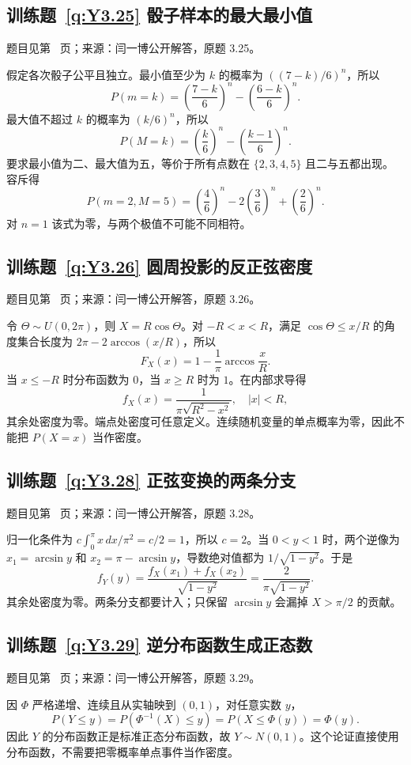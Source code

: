 \subsection*{训练题~\ref{q:Y3.25} 骰子样本的最大最小值}\label{a:Y3.25}{\small 题目见第~\pageref{q:Y3.25} 页；来源：闫一博公开解答，原题 3.25。}
\begin{solve}假定各次骰子公平且独立。最小值至少为 $k$ 的概率为 $((7-k)/6)^n$，所以\[P(m=k)=\left(\frac{7-k}{6}\right)^n-\left(\frac{6-k}{6}\right)^n.\]最大值不超过 $k$ 的概率为 $(k/6)^n$，所以\[P(M=k)=\left(\frac{k}{6}\right)^n-\left(\frac{k-1}{6}\right)^n.\]要求最小值为二、最大值为五，等价于所有点数在 $\{2,3,4,5\}$ 且二与五都出现。容斥得\[P(m=2,M=5)=\left(\frac46\right)^n-2\left(\frac36\right)^n+\left(\frac26\right)^n.\]对 $n=1$ 该式为零，与两个极值不可能不同相符。\end{solve}

\subsection*{训练题~\ref{q:Y3.26} 圆周投影的反正弦密度}\label{a:Y3.26}{\small 题目见第~\pageref{q:Y3.26} 页；来源：闫一博公开解答，原题 3.26。}
\begin{solve}令 $\Theta\sim U(0,2\pi)$，则 $X=R\cos\Theta$。对 $-R<x<R$，满足 $\cos\Theta\le x/R$ 的角度集合长度为 $2\pi-2\arccos(x/R)$，所以\[F_X(x)=1-\frac{1}{\pi}\arccos\frac{x}{R}.\]当 $x\le-R$ 时分布函数为 $0$，当 $x\ge R$ 时为 $1$。在内部求导得\[f_X(x)=\frac{1}{\pi\sqrt{R^2-x^2}},\quad |x|<R,\]其余处密度为零。端点处密度可任意定义。连续随机变量的单点概率为零，因此不能把 $P(X=x)$ 当作密度。\end{solve}

\subsection*{训练题~\ref{q:Y3.28} 正弦变换的两条分支}\label{a:Y3.28}{\small 题目见第~\pageref{q:Y3.28} 页；来源：闫一博公开解答，原题 3.28。}
\begin{solve}归一化条件为 $c\int_0^\pi x\,dx/\pi^2=c/2=1$，所以 $c=2$。当 $0<y<1$ 时，两个逆像为 $x_1=\arcsin y$ 和 $x_2=\pi-\arcsin y$，导数绝对值都为 $1/\sqrt{1-y^2}$。于是\[f_Y(y)=\frac{f_X(x_1)+f_X(x_2)}{\sqrt{1-y^2}}=\frac{2}{\pi\sqrt{1-y^2}}.\]其余处密度为零。两条分支都要计入；只保留 $\arcsin y$ 会漏掉 $X>\pi/2$ 的贡献。\end{solve}

\subsection*{训练题~\ref{q:Y3.29} 逆分布函数生成正态数}\label{a:Y3.29}{\small 题目见第~\pageref{q:Y3.29} 页；来源：闫一博公开解答，原题 3.29。}
\begin{solve}因 $\Phi$ 严格递增、连续且从实轴映到 $(0,1)$，对任意实数 $y$，\[P(Y\le y)=P(\Phi^{-1}(X)\le y)=P(X\le\Phi(y))=\Phi(y).\]因此 $Y$ 的分布函数正是标准正态分布函数，故 $Y\sim N(0,1)$。这个论证直接使用分布函数，不需要把零概率单点事件当作密度。\end{solve}

